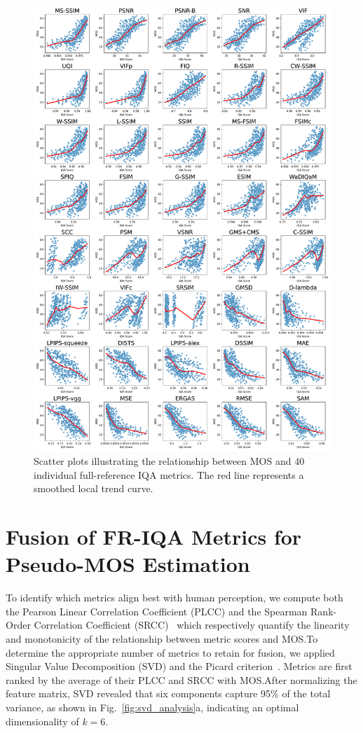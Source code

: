 \begin{figure}
    \centering
    \includegraphics[width=0.90\linewidth]{images/mos_vs_iqa_grid.pdf}
    \caption{Scatter plots illustrating the relationship between MOS and 40 individual full-reference IQA metrics. The red line represents a smoothed local trend curve.}\label{fig:mos_vs_iqa}
\end{figure}

\section{Fusion of FR-IQA Metrics for Pseudo-MOS Estimation}

To identify which metrics align best with human perception, we compute both the Pearson Linear Correlation Coefficient (PLCC) and the Spearman Rank-Order Correlation Coefficient (SRCC)~\cite{plcc-srcc} which respectively quantify the linearity and monotonicity of the relationship between metric scores and MOS.\@ To determine the appropriate number of metrics to retain for fusion, we applied Singular Value Decomposition (SVD) and the Picard criterion~\cite{hansen1998picard}. Metrics are first ranked by the average of their PLCC and SRCC with MOS.\@ After normalizing the feature matrix, SVD revealed that six components capture 95\% of the total variance, as shown in Fig.~\ref{fig:svd_analysis}a, indicating an optimal dimensionality of $k=6$.

